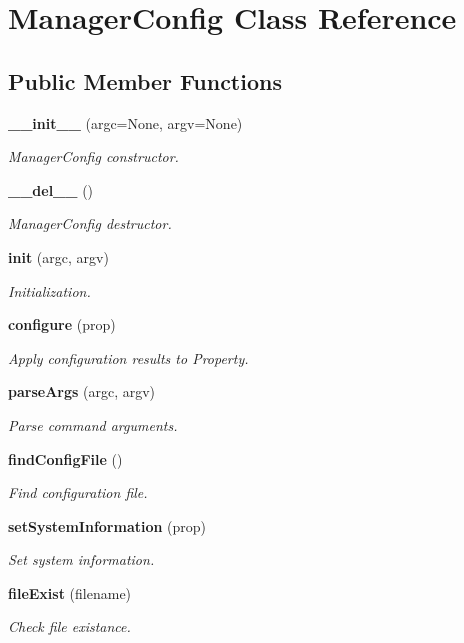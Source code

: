 \section{Manager\-Config Class Reference}
\label{classManagerConfig}
\subsection*{Public Member Functions}
\begin{CompactItemize}
\item 
{\bf \_\-\_\-init\_\-\_\-} (argc=None, argv=None)
\begin{CompactList}\small\item\em Manager\-Config constructor. \item\end{CompactList}\item 
{\bf \_\-\_\-del\_\-\_\-} ()
\begin{CompactList}\small\item\em Manager\-Config destructor. \item\end{CompactList}\item 
{\bf init} (argc, argv)
\begin{CompactList}\small\item\em Initialization. \item\end{CompactList}\item 
{\bf configure} (prop)
\begin{CompactList}\small\item\em Apply configuration results to Property. \item\end{CompactList}\item 
{\bf parse\-Args} (argc, argv)
\begin{CompactList}\small\item\em Parse command arguments. \item\end{CompactList}\item 
{\bf find\-Config\-File} ()
\begin{CompactList}\small\item\em Find configuration file. \item\end{CompactList}\item 
{\bf set\-System\-Information} (prop)
\begin{CompactList}\small\item\em Set system information. \item\end{CompactList}\item 
{\bf file\-Exist} (filename)
\begin{CompactList}\small\item\em Check file existance. \item\end{CompactList}\end{CompactItemize}



